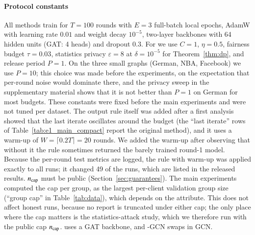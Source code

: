 \paragraph{Protocol constants}
All methods train for $T=100$ rounds with $E=3$ full-batch local epochs, AdamW with learning rate $0.01$ and weight decay $10^{-5}$, two-layer backbones with 64 hidden units (GAT: 4 heads) and dropout $0.3$. For \clamp{} we use $C=1$, $\eta=0.5$, fairness budget $\tau=0.03$, statistics privacy $\varepsilon=8$ at $\delta=10^{-5}$ for Theorem~\ref{thm:dp}, and release period $P=1$. On the three small graphs (German, NBA, Facebook) we use $P=10$; this choice was made before the experiments, on the expectation that per-round noise would dominate there, and the privacy sweep in the supplementary material shows that it is not better than $P=1$ on German for most budgets. These constants were fixed before the main experiments and were not tuned per dataset. The output rule itself was added after a first analysis showed that the last iterate oscillates around the budget (the ``last iterate'' rows of Table~\ref{tab:e1_main_compact} report the original method), and it uses a warm-up of $W=\lceil0.2T\rceil=20$ rounds. We added the warm-up after observing that without it the rule sometimes returned the barely trained round-1 model. Because the per-round test metrics are logged, the rule with warm-up was applied exactly to all runs; it changed 49 of the runs, which are listed in the released results. $n_{\mathrm{cap}}$ must be public (Section~\ref{sec:guarantees}). The main experiments computed the cap per group, as the largest per-client validation group size (``group cap'' in Table~\ref{tab:data}), which depends on the attribute. This does not affect honest runs, because no report is truncated under either cap; the only place where the cap matters is the statistics-attack study, which we therefore run with the public cap $n_{\mathrm{cap}}$. \clamp{} uses a GAT backbone, and \clamp{}-GCN swaps in GCN.

